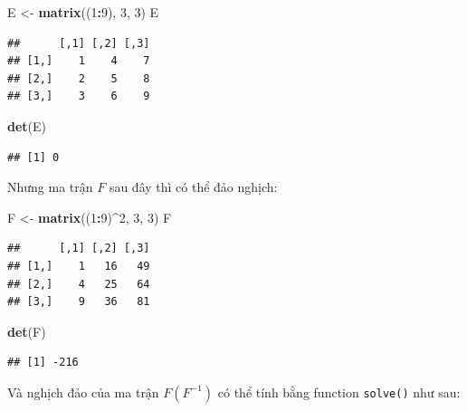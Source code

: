 \documentclass[
]{book}
\newenvironment{Shaded}{\begin{snugshade}}{\end{snugshade}}
\newcommand{\DecValTok}[1]{\textcolor[rgb]{0.00,0.00,0.81}{#1}}
\newcommand{\KeywordTok}[1]{\textcolor[rgb]{0.13,0.29,0.53}{\textbf{#1}}}
\newcommand{\NormalTok}[1]{#1}
\newcommand{\OperatorTok}[1]{\textcolor[rgb]{0.81,0.36,0.00}{\textbf{#1}}}
\newcommand{\StringTok}[1]{\textcolor[rgb]{0.31,0.60,0.02}{#1}}
\begin{document}
\begin{Shaded}
\begin{Highlighting}[]
\NormalTok{E \textless{}{-}}\StringTok{ }\KeywordTok{matrix}\NormalTok{((}\DecValTok{1}\OperatorTok{:}\DecValTok{9}\NormalTok{), }\DecValTok{3}\NormalTok{, }\DecValTok{3}\NormalTok{)}
\NormalTok{E}
\end{Highlighting}
\end{Shaded}

\begin{verbatim}
##      [,1] [,2] [,3]
## [1,]    1    4    7
## [2,]    2    5    8
## [3,]    3    6    9
\end{verbatim}

\begin{Shaded}
\begin{Highlighting}[]
\KeywordTok{det}\NormalTok{(E)}
\end{Highlighting}
\end{Shaded}

\begin{verbatim}
## [1] 0
\end{verbatim}

Nhưng ma trận \(F\) sau đây thì có thể đảo nghịch:

\begin{Shaded}
\begin{Highlighting}[]
\NormalTok{F \textless{}{-}}\StringTok{ }\KeywordTok{matrix}\NormalTok{((}\DecValTok{1}\OperatorTok{:}\DecValTok{9}\NormalTok{)}\OperatorTok{\^{}}\DecValTok{2}\NormalTok{, }\DecValTok{3}\NormalTok{, }\DecValTok{3}\NormalTok{)}
\NormalTok{F}
\end{Highlighting}
\end{Shaded}

\begin{verbatim}
##      [,1] [,2] [,3]
## [1,]    1   16   49
## [2,]    4   25   64
## [3,]    9   36   81
\end{verbatim}

\begin{Shaded}
\begin{Highlighting}[]
\KeywordTok{det}\NormalTok{(F)}
\end{Highlighting}
\end{Shaded}

\begin{verbatim}
## [1] -216
\end{verbatim}

Và nghịch đảo của ma trận \(F(F^{-1})\) có thể tính bằng function \texttt{solve()} như sau:
\end{document}
